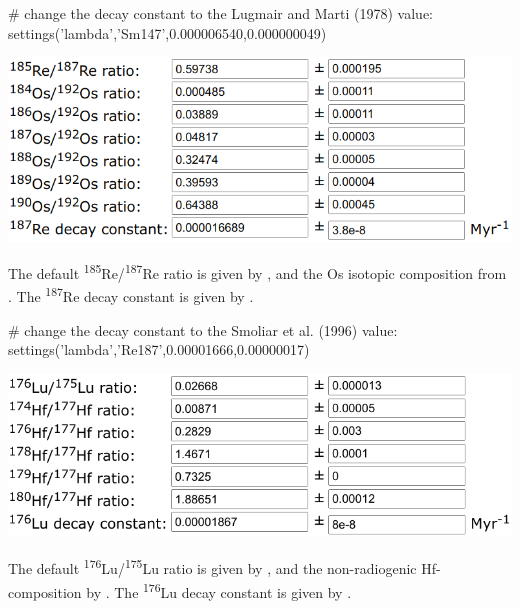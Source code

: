\begin{refsection}
\begin{script}
# change the decay constant to the Lugmair and Marti (1978) value:
settings('lambda','Sm147',0.000006540,0.000000049)
\end{script}

\noindent\begin{minipage}[t]{.6\linewidth}
\strut\vspace*{-\baselineskip}\newline
\includegraphics[width=\linewidth]{../figures/ReOsLambda.png}
\end{minipage}
\begin{minipage}[t]{.4\linewidth}
The default \textsuperscript{185}Re/\textsuperscript{187}Re ratio is
given by \citet{gramlich1973}, and the Os isotopic composition from
\citet{volkening1991}. The \textsuperscript{187}Re decay constant is
given by \citet{selby2007}.\\
\end{minipage}

\begin{script}
# change the decay constant to the Smoliar et al. (1996) value:
settings('lambda','Re187',0.00001666,0.00000017)
\end{script}

\noindent\begin{minipage}[t]{.6\linewidth}
\strut\vspace*{-\baselineskip}\newline
\includegraphics[width=\linewidth]{../figures/LuHfLambda.png}
\end{minipage}
\begin{minipage}[t]{.4\linewidth}
The default \textsuperscript{176}Lu/\textsuperscript{175}Lu ratio is
given by \citet{delaeter2006}, and the non-radiogenic Hf-composition
by \citet{patchett1983}. The \textsuperscript{176}Lu decay constant is
given by \citet{soderlund2004}.
\end{minipage}


\end{refsection}
